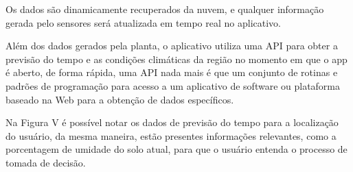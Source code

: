 \documentclass[eso]{bcc}
\begin{document}
Os dados são dinamicamente recuperados da nuvem, e qualquer informação gerada pelo sensores será 
atualizada em tempo real no aplicativo.

Além dos dados gerados pela planta, o aplicativo utiliza uma API para obter a previsão do tempo 
e as condições climáticas da região no momento em que o app é aberto, de forma rápida, uma API 
nada mais é que um conjunto de rotinas e padrões de programação para acesso a um aplicativo de 
software ou plataforma baseado na Web para a obtenção de dados específicos.

Na Figura V é possível notar os dados de previsão do tempo para  a localização do usuário, 
da mesma maneira, estão presentes informações relevantes, como a porcentagem de umidade do 
solo atual,  para que o usuário entenda o processo de tomada de decisão.
\end{document}
